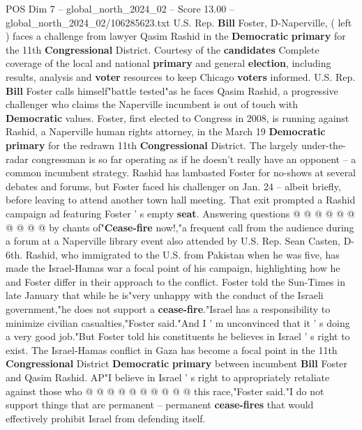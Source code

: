 \begin{textsample}{POS Dim 7 – global\_north\_2024\_02 – Score 13.00 – global\_north\_2024\_02/106285623.txt}  \label{ex:f7_pos_027}
U.S.
Rep. \textbf{Bill} Foster, D-Naperville, ( left ) faces a challenge from lawyer Qasim Rashid in the \textbf{Democratic} \textbf{primary} for the 11th \textbf{Congressional} District.
Courtesy of the \textbf{candidates} Complete coverage of the local and national \textbf{primary} and general \textbf{election}, including results, analysis and \textbf{voter} resources to keep Chicago \textbf{voters} informed.
U.S.
Rep. \textbf{Bill} Foster calls himself"battle tested"as he faces Qasim Rashid, a progressive challenger who claims the Naperville incumbent is out of touch with \textbf{Democratic} values.
Foster, first elected to Congress in 2008, is running against Rashid, a Naperville human rights attorney, in the March 19 \textbf{Democratic} \textbf{primary} for the redrawn 11th \textbf{Congressional} District.
The largely under-the-radar congressman is so far operating as if he doesn't really have an opponent -- a common incumbent strategy.
Rashid has lambasted Foster for no-shows at several debates and forums, but Foster faced his challenger on Jan. 24 -- albeit briefly, before leaving to attend another town hall meeting.
That exit prompted a Rashid campaign ad featuring Foster ' s empty \textbf{seat}.
Answering questions @ @ @ @ @ @ @ @ @ @ by chants of"\textbf{Cease-fire} now!,"a frequent call from the audience during a forum at a Naperville library event also attended by U.S.
Rep.
Sean Casten, D-6th.
Rashid, who immigrated to the U.S. from Pakistan when he was five, has made the Israel-Hamas war a focal point of his campaign, highlighting how he and Foster differ in their approach to the conflict.
Foster told the Sun-Times in late January that while he is"very unhappy with the conduct of the Israeli government,"he does not support a \textbf{cease-fire}."Israel has a responsibility to minimize civilian casualties,"Foster said."And I ' m unconvinced that it ' s doing a very good job."But Foster told his constituents he believes in Israel ' s right to exist.
The Israel-Hamas conflict in Gaza has become a focal point in the 11th \textbf{Congressional} District \textbf{Democratic} \textbf{primary} between incumbent \textbf{Bill} Foster and Qasim Rashid.
AP"I believe in Israel ' s right to appropriately retaliate against those who @ @ @ @ @ @ @ @ @ @ this race,"Foster said."I do not support things that are permanent -- permanent \textbf{cease-fires} that would effectively prohibit Israel from defending itself.

\end{textsample}
